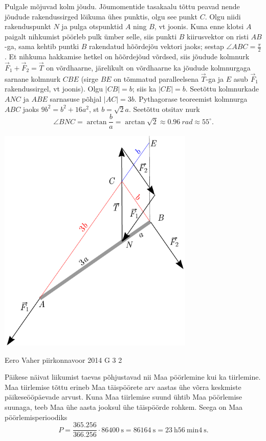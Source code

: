 \documentclass[11pt]{article}
\begin{document}
{{\ifSolution
Pulgale mõjuvad kolm jõudu. Jõumomentide tasakaalu tõttu peavad nende jõudude rakendussirged lõikuma ühes punktis, olgu see punkt $C$. Olgu niidi rakenduspunkt $N$ ja pulga otspunktid $A$ ning $B$, vt joonis. Kuna enne klotsi $A$ paigalt nihkumist pöörleb pulk ümber selle, siis punkti $B$ kiirusvektor on risti $AB$-ga, sama kehtib puntki $B$ rakendatud hõõrdejõu vektori jaoks; sestap $\angle ABC=\frac{\pi}{2}$. Et nihkuma hakkamise hetkel on hõõrdejõud võrdsed, siis jõudude kolmnurk $\vec F_1+\vec F_2=\vec T$ on võrdhaarne, järelikult on võrdhaarne ka jõudude kolmnurgaga sarnane kolmnurk $CBE$ (sirge $BE$ on tõmmatud paralleelsena $\vec T$-ga ja $E$ asub $\vec F_1$ rakendussirgel, vt joonis).
Olgu $|CB|=b$; siis ka $|CE|=b$. Seetõttu kolmnurkade $ANC$ ja $ABE$ sarnasuse põhjal $|AC|=3b$. Pythagorase
teoreemist kolmnurga $ABC$ jaoks $9b^2=b^2+16a^2$, st $b=\sqrt 2a$. Seetõttu otsitav nurk 
\[
\angle BNC=\arctan \frac ba =\arctan \sqrt 2\approx\SI{0.96}{rad}\approx 55^\circ.
\]
\begin{center}
\includegraphics[width=0.7\textwidth]{2015-v3g-09-pulk_lah}
\end{center}
\fi
}

{Eero Vaher} %
{piirkonnavoor} %
{2014} %
{G 3} %
{2} %
{

\ifSolution
Päikese näivat liikumist taevas põhjustavad nii Maa pöörlemine kui ka tiirlemine. Maa tiirlemise tõttu erineb Maa täispöörete arv aastas ühe võrra keskmiste päikeseööpäevade arvust. Kuna Maa tiirlemise suund ühtib Maa pöörlemise suunaga, teeb Maa ühe aasta jooksul ühe täispöörde rohkem. Seega on Maa pöörlemisperioodiks
\[
P=\frac{\num{365,256}}{\num{366,256}} \cdot \SI{86400}{\second}=\SI{86164}{\second}=\SI{23}{\hour} \SI{56}{\minute} \SI{4}{\second}.
\]

}}
\end{document}
